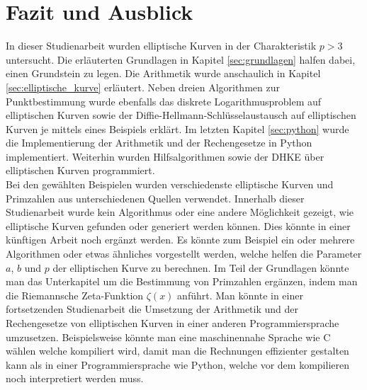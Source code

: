 \chapter{Fazit und Ausblick}
In dieser Studienarbeit wurden elliptische Kurven in der Charakteristik $p > 3$ untersucht. Die erläuterten Grundlagen in Kapitel \ref{sec:grundlagen} halfen dabei, einen Grundstein zu legen. Die Arithmetik wurde anschaulich in Kapitel \ref{sec:elliptische_kurve} erläutert. Neben dreien Algorithmen zur Punktbestimmung wurde ebenfalls das diskrete Logarithmusproblem auf elliptischen Kurven sowie der Diffie-Hellmann-Schlüsselaustausch auf elliptischen Kurven je mittels eines Beispiels erklärt. Im letzten Kapitel \ref{sec:python} wurde die Implementierung der Arithmetik und der Rechengesetze in Python implementiert. Weiterhin wurden Hilfsalgorithmen sowie der DHKE über elliptischen Kurven programmiert.\\

Bei den gewählten Beispielen wurden verschiedenste elliptische Kurven und Primzahlen aus unterschiedenen Quellen verwendet. Innerhalb dieser Studienarbeit wurde kein Algorithmus oder eine andere Möglichkeit gezeigt, wie elliptische Kurven gefunden oder generiert werden können. Dies könnte in einer künftigen Arbeit noch ergänzt werden. Es könnte zum Beispiel ein oder mehrere Algorithmen oder etwas ähnliches vorgestellt werden, welche helfen die Parameter $a$, $b$ und $p$ der elliptischen Kurve zu berechnen. Im Teil der Grundlagen könnte man das Unterkapitel um die Bestimmung von Primzahlen ergänzen, indem man die Riemannsche Zeta-Funktion $\zeta (x)$ anführt. Man könnte in einer fortsetzenden Studienarbeit die Umsetzung der Arithmetik und der Rechengesetze von elliptischen Kurven in einer anderen Programmiersprache umzusetzen. Beispielsweise könnte man eine maschinennahe Sprache wie C wählen welche kompiliert wird, damit man die Rechnungen effizienter gestalten kann als in einer Programmiersprache wie Python, welche vor dem kompilieren noch interpretiert werden muss.